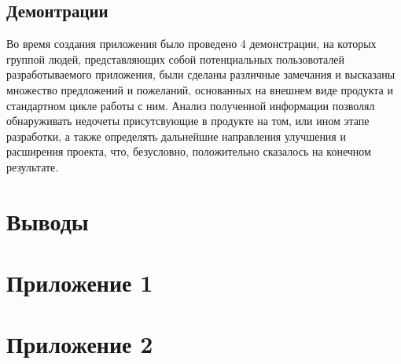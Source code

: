 \subsection{Демонтрации}

Во время создания приложения было проведено 4 демонстрации, на которых группой людей, представляющих собой потенциальных пользовоталей разработываемого приложения, были сделаны различные замечания и высказаны множество предложений и пожеланий, основанных на внешнем виде продукта и стандартном цикле работы с ним. Анализ полученной информации позволял обнаруживать недочеты присутсвующие в продукте на том, или ином этапе разработки, а также определять дальнейшие направления улучшения и расширения проекта, что, безусловно, положительно сказалось на конечном результате.

\section{Выводы}

\section{Приложение 1}

\section{Приложение 2}

%
%
%
%
%
%
%
%
%
%
%

